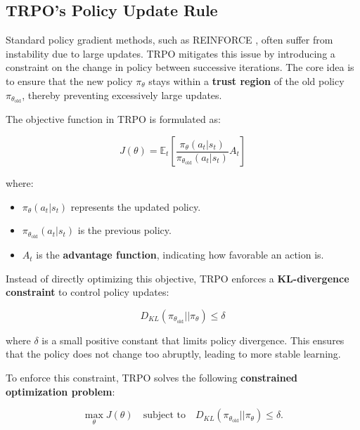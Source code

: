 \documentclass[12pt]{extreport} %
\begin{document}
\subsection{\textbf{TRPO's Policy Update Rule}}

Standard policy gradient methods, such as REINFORCE \cite{williams1992simple}, often suffer from instability due to large updates. TRPO mitigates this issue by introducing a constraint on the change in policy between successive iterations. The core idea is to ensure that the new policy \( \pi_{\theta} \) stays within a \textbf{trust region} of the old policy \( \pi_{\theta_{\text{old}}} \), thereby preventing excessively large updates.

The objective function in TRPO is formulated as:

\begin{equation}
J(\theta) = \mathbb{E}_t \left[ \frac{\pi_{\theta}(a_t | s_t)}{\pi_{\theta_{\text{old}}}(a_t | s_t)} A_t \right]
\end{equation}

where:
\begin{itemize}
    \item \( \pi_{\theta}(a_t | s_t) \) represents the updated policy.
    \item \( \pi_{\theta_{\text{old}}}(a_t | s_t) \) is the previous policy.
    \item \( A_t \) is the \textbf{advantage function}, indicating how favorable an action is.
\end{itemize}

Instead of directly optimizing this objective, TRPO enforces a \textbf{KL-divergence constraint} to control policy updates:

\begin{equation}
D_{KL}(\pi_{\theta_{\text{old}}} || \pi_{\theta}) \leq \delta
\end{equation}

where \( \delta \) is a small positive constant that limits policy divergence. This ensures that the policy does not change too abruptly, leading to more stable learning.

To enforce this constraint, TRPO solves the following \textbf{constrained optimization problem}:

\begin{equation}
\max_{\theta} J(\theta) \quad \text{subject to} \quad D_{KL}(\pi_{\theta_{\text{old}}} || \pi_{\theta}) \leq \delta.
\end{equation}
\end{document}
